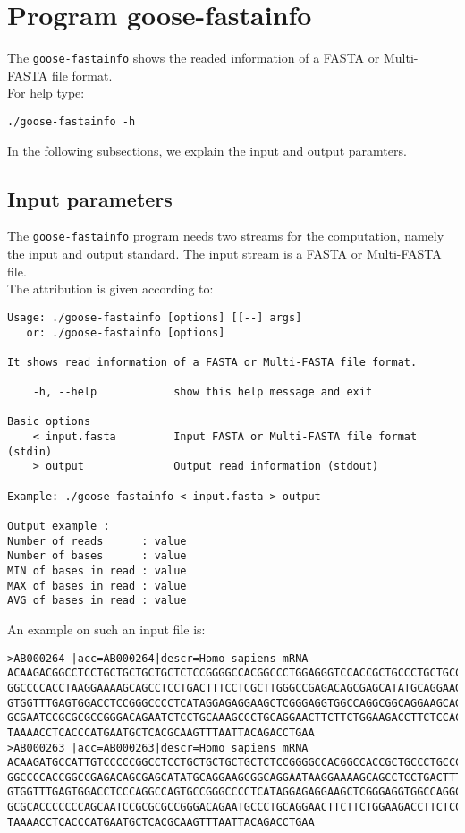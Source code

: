 \section{Program goose-fastainfo}
The \texttt{goose-fastainfo} shows the readed information of a FASTA or Multi-FASTA file format.\\
For help type:
\begin{lstlisting}
./goose-fastainfo -h
\end{lstlisting}
In the following subsections, we explain the input and output paramters.

\subsection*{Input parameters}

The \texttt{goose-fastainfo} program needs two streams for the computation,
namely the input and output standard. The input stream is a FASTA or Multi-FASTA file.\\
The attribution is given according to:
\begin{lstlisting}
Usage: ./goose-fastainfo [options] [[--] args]
   or: ./goose-fastainfo [options]

It shows read information of a FASTA or Multi-FASTA file format.

    -h, --help            show this help message and exit

Basic options
    < input.fasta         Input FASTA or Multi-FASTA file format (stdin)
    > output              Output read information (stdout)

Example: ./goose-fastainfo < input.fasta > output

Output example :
Number of reads      : value
Number of bases      : value
MIN of bases in read : value
MAX of bases in read : value
AVG of bases in read : value
\end{lstlisting}
An example on such an input file is:
\begin{lstlisting}
>AB000264 |acc=AB000264|descr=Homo sapiens mRNA 
ACAAGACGGCCTCCTGCTGCTGCTGCTCTCCGGGGCCACGGCCCTGGAGGGTCCACCGCTGCCCTGCTGCCATTGTCCCC
GGCCCCACCTAAGGAAAAGCAGCCTCCTGACTTTCCTCGCTTGGGCCGAGACAGCGAGCATATGCAGGAAGCGGCAGGAA
GTGGTTTGAGTGGACCTCCGGGCCCCTCATAGGAGAGGAAGCTCGGGAGGTGGCCAGGCGGCAGGAAGCAGGCCAGTGCC
GCGAATCCGCGCGCCGGGACAGAATCTCCTGCAAAGCCCTGCAGGAACTTCTTCTGGAAGACCTTCTCCACCCCCCCAGC
TAAAACCTCACCCATGAATGCTCACGCAAGTTTAATTACAGACCTGAA
>AB000263 |acc=AB000263|descr=Homo sapiens mRNA 
ACAAGATGCCATTGTCCCCCGGCCTCCTGCTGCTGCTGCTCTCCGGGGCCACGGCCACCGCTGCCCTGCCCCTGGAGGGT
GGCCCCACCGGCCGAGACAGCGAGCATATGCAGGAAGCGGCAGGAATAAGGAAAAGCAGCCTCCTGACTTTCCTCGCTTG
GTGGTTTGAGTGGACCTCCCAGGCCAGTGCCGGGCCCCTCATAGGAGAGGAAGCTCGGGAGGTGGCCAGGCGGCAGGAAG
GCGCACCCCCCCAGCAATCCGCGCGCCGGGACAGAATGCCCTGCAGGAACTTCTTCTGGAAGACCTTCTCCTCCTGCAAA
TAAAACCTCACCCATGAATGCTCACGCAAGTTTAATTACAGACCTGAA
\end{lstlisting}

